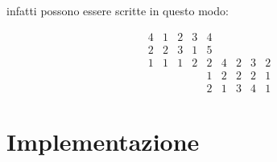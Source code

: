 \documentclass{article}
\begin{document}
infatti possono essere scritte in questo modo:
            
$$
\begin{array}{cccccccccc}
4 & 1 & 2 & 3 & 4 &   &   &   &   \\
2 & 2 & 3 & 1 & 5 &   &   &   &   \\
1 & 1 & 1 & 2 & 2 & 4 & 2 & 3 & 2 \\
  &   &   &   & 1 & 2 & 2 & 2 & 1 \\
  &   &   &   & 2 & 1 & 3 & 4 & 1
\end{array}
$$

\section*{Implementazione}
\end{document}
